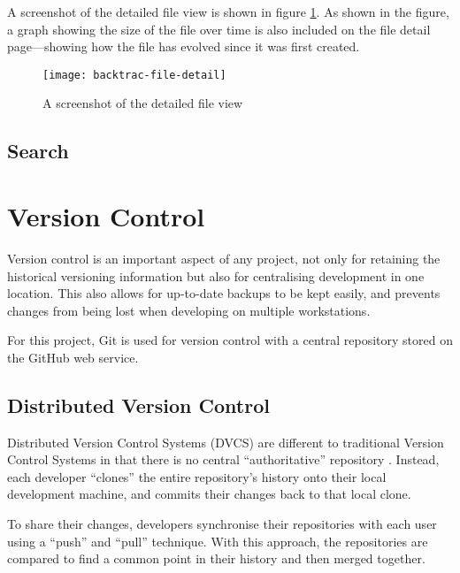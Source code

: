 A screenshot of the detailed file view is shown in figure
\ref{fig:backtrac-file-detail}. As shown in the figure, a graph showing the
size of the file over time is also included on the file detail page---showing
how the file has evolved since it was first created.

\begin{figure}[h]
    \begin{center}
        \texttt{[image: backtrac-file-detail]}
    \end{center}
    \caption{A screenshot of the detailed file view}
    \label{fig:backtrac-file-detail}
\end{figure}

\subsection{Search}
\label{sec:implementation-web-search}

\section{Version Control}
\label{sec:implementation-versioncontrol}

Version control is an important aspect of any project, not only for retaining
the historical versioning information but also for centralising development in
one location. This also allows for up-to-date backups to be kept easily, and
prevents changes from being lost when developing on multiple workstations.

For this project, Git is used for version control with a central repository
stored on the GitHub web service.

\subsection{Distributed Version Control}

Distributed Version Control Systems (DVCS) are different to traditional Version
Control Systems in that there is no central ``authoritative'' repository
\cite{robert2006}. Instead, each developer ``clones'' the entire repository's
history onto their local development machine, and commits their changes back to
that local clone.

To share their changes, developers synchronise their repositories with each
user using a ``push'' and ``pull'' technique. With this approach, the
repositories are compared to find a common point in their history and then
merged together.

